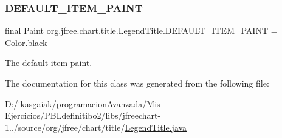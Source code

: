 \subsubsection{\texorpdfstring{D\+E\+F\+A\+U\+L\+T\+\_\+\+I\+T\+E\+M\+\_\+\+P\+A\+I\+NT}{DEFAULT\_ITEM\_PAINT}}
{\footnotesize\ttfamily final Paint org.\+jfree.\+chart.\+title.\+Legend\+Title.\+D\+E\+F\+A\+U\+L\+T\+\_\+\+I\+T\+E\+M\+\_\+\+P\+A\+I\+NT = Color.\+black\hspace{0.3cm}{\ttfamily [static]}}

The default item paint. 

The documentation for this class was generated from the following file\+:\begin{DoxyCompactItemize}
\item 
D\+:/ikasgaiak/programacion\+Avanzada/\+Mis Ejercicios/\+P\+B\+Ldefinitibo2/libs/jfreechart-\/1../source/org/jfree/chart/title/\mbox{\hyperlink{_legend_title_8java}{Legend\+Title.\+java}}\end{DoxyCompactItemize}
